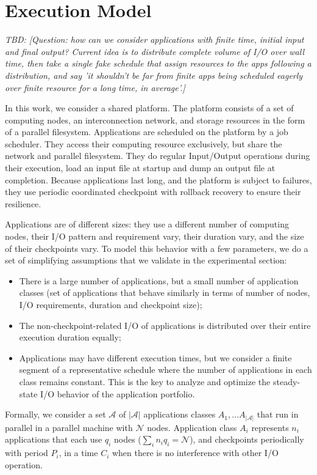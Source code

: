 \documentclass{article}
\newcommand{\appset}{{\mathcal A}}
\newcommand{\nbnodesplat}{{\mathcal N}}
\newcommand{\nbapps}{|{\mathcal A}|}
\newcommand{\app}[1]{A_{#1}}
\newcommand{\nbapp}[1]{n_{#1}}
\newcommand{\nbnodes}[1]{q_{#1}}
\newcommand{\period}[1]{P_{#1}}
\newcommand{\ckpt}[1]{C_{#1}}
\newcommand{\todo}[1]{\textit{TBD: [#1]}}
\begin{document}
\section{Execution Model}
\label{sec.model}

\todo{Question: how can we consider applications with finite time, initial
  input and final output? Current idea is to distribute complete
  volume of I/O over wall time, then take a single fake schedule that
  assign resources to the apps following a distribution, and say 'it
  shouldn't be far from finite apps being scheduled eagerly over
  finite resource for a long time, in average'.}

In this work, we consider a shared platform. The platform consists of
a set of computing nodes, an interconnection network, and storage
resources in the form of a parallel filesystem. Applications are
scheduled on the platform by a job scheduler. They access their
computing resource exclusively, but share the network and parallel
filesystem. They do regular Input/Output operations during their
execution, load an input file at startup and dump an output file at
completion. Because applications last long, and the platform is
subject to failures, they use periodic coordinated checkpoint with
rollback recovery to ensure their resilience.

Applications are of different sizes: they use a different number of
computing nodes, their I/O pattern and requirement vary, their
duration vary, and the size of their checkpoints vary. To model this
behavior with a few parameters, we do a set of simplifying assumptions
that we validate in the experimental section:
\begin{itemize}
  \item There is a large number of applications, but a small number of
    application classes (set of applications that behave similarly in
    terms of number of nodes, I/O requirements, duration and
    checkpoint size);
  \item The non-checkpoint-related I/O of applications is distributed
    over their entire execution duration equally;
  \item Applications may have different execution times, but we consider a finite
    segment of a representative schedule where the number of applications in each class remains constant. This is the key to analyze and optimize the steady-state I/O behavior of the 
    application portfolio. 
\end{itemize}

Formally, we consider a set $\appset$ of $\nbapps$ applications
classes $\app{1}, \ldots \app{\nbapps}$ that run in parallel in a
parallel machine with $\nbnodesplat$ nodes. Application class
$\app{i}$ represents $\nbapp{i}$ applications that each use
$\nbnodes{i}$ nodes
($\sum_{i}\nbapp{i} \nbnodes{i} = \nbnodesplat$), and checkpoints
periodically with period $\period{i}$, in a time $\ckpt{i}$ when there
is no interference with other I/O operation.
\end{document}
